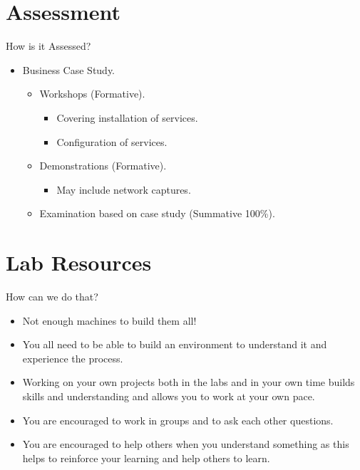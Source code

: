 \documentclass[aspectratio=169]{beamer}
\begin{document}
\section{Assessment}
\begin{frame}{How is it Assessed?}
  \begin{itemize}
    \item Business Case Study.
    \begin{itemize}
      \item Workshops (Formative).
        \begin{itemize}
          \item Covering installation of services.
          \item Configuration of services.
        \end{itemize}
      \item Demonstrations (Formative).
        \begin{itemize}
          \item May include network captures.
        \end{itemize}
    \item Examination based on case study (Summative 100\%).
    \end{itemize}
  \end{itemize}
\end{frame}

\section{Lab Resources}
\begin{frame}{How can we do that?}
  \begin{itemize}
    \item Not enough machines to build them all!
    \item You all need to be able to build an environment to understand it and experience the process.
    \item Working on your own projects both in the labs and in your own time builds skills and understanding and allows you to work at your own pace.
    \item You are encouraged to work in groups and to ask each other questions.
    \item You are encouraged to help others when you understand something as this helps to reinforce your learning and help others to learn. 
  \end{itemize}
\end{frame}
\end{document}
